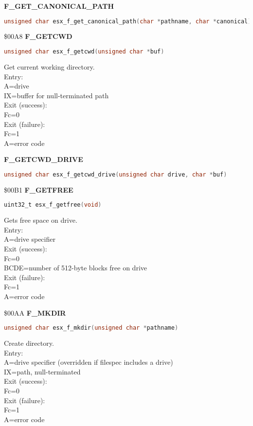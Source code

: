 \textbf{F\_GET\_CANONICAL\_PATH}

\begin{lstlisting}[language=C]
unsigned char esx_f_get_canonical_path(char *pathname, char *canonical)
\end{lstlisting}

\$00A8 \textbf{F\_GETCWD}

\begin{lstlisting}[language=C]
unsigned char esx_f_getcwd(unsigned char *buf)
\end{lstlisting}

Get current working directory.\\
Entry:\\
A=drive\\
IX=buffer for null-terminated path\\
Exit (success):\\
Fc=0\\
Exit (failure):\\
Fc=1\\
A=error code

\textbf{F\_GETCWD\_DRIVE}

\begin{lstlisting}[language=C]
unsigned char esx_f_getcwd_drive(unsigned char drive, char *buf)
\end{lstlisting}

\$00B1 \textbf{F\_GETFREE}

\begin{lstlisting}[language=C]
uint32_t esx_f_getfree(void)
\end{lstlisting}

Gets free space on drive.\\
Entry:\\
A=drive specifier\\
Exit (success):\\
Fc=0\\
BCDE=number of 512-byte blocks free on drive\\
Exit (failure):\\
Fc=1\\
A=error code

\$00AA \textbf{F\_MKDIR}

\begin{lstlisting}[language=C]
unsigned char esx_f_mkdir(unsigned char *pathname)
\end{lstlisting}

Create directory.\\
Entry:\\
A=drive specifier (overridden if filespec includes a drive)\\
IX=path, null-terminated\\
Exit (success):\\
Fc=0\\
Exit (failure):\\
Fc=1\\
A=error code

